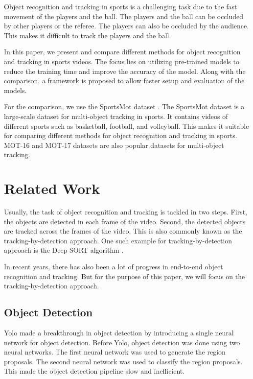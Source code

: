\documentclass[runningheads]{llncs}
\begin{document}
Object recognition and tracking in sports is a challenging task due to the fast movement of the players and the ball.
The players and the ball can be occluded by other players or the referee.
The players can also be occluded by the audience.
This makes it difficult to track the players and the ball.

In this paper, we present and compare different methods for object recognition and tracking in sports videos.
The focus lies on utilizing pre-trained models to reduce the training time and improve the accuracy of the model.
Along with the comparison, a framework is proposed to allow faster setup and evaluation of the models.

For the comparison, we use the SportsMot dataset \cite{cui2023sportsmot}.
The SportsMot dataset is a large-scale dataset for multi-object tracking in sports.
It contains videos of different sports such as basketball, football, and volleyball.
This makes it suitable for comparing different methods for object recognition and tracking in sports.
MOT-16 and MOT-17 datasets \cite{milan2016mot16} are also popular datasets for multi-object tracking.


\section{Related Work}
Usually, the task of object recognition and tracking is tackled in two steps.
First, the objects are detected in each frame of the video.
Second, the detected objects are tracked across the frames of the video.
This is also commonly known as the tracking-by-detection approach.
One such example for tracking-by-detection approach is the Deep SORT algorithm \cite{DBLP:journals/corr/abs-1907-03465}.

In recent years, there has also been a lot of progress in end-to-end object recognition and tracking.
But for the purpose of this paper, we will focus on the tracking-by-detection approach.



\subsection{Object Detection}

Yolo \cite{yolo2015} made a breakthrough in object detection by introducing a single neural network for object detection.
Before Yolo, object detection was done using two neural networks.
The first neural network was used to generate the region proposals.
The second neural network was used to classify the region proposals.
This made the object detection pipeline slow and inefficient.
\end{document}
